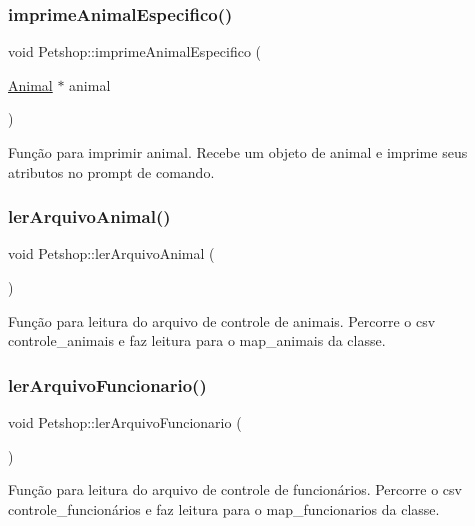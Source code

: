 \subsubsection{\texorpdfstring{imprime\+Animal\+Especifico()}{imprimeAnimalEspecifico()}}
{\footnotesize\ttfamily void Petshop\+::imprime\+Animal\+Especifico (\begin{DoxyParamCaption}\item[{\hyperlink{classAnimal}{Animal} $\ast$}]{animal }\end{DoxyParamCaption})}

Função para imprimir animal. Recebe um objeto de animal e imprime seus atributos no prompt de comando. \mbox{\label{classPetshop_a89862e7eff30a1241775ee836bc7a450}} 
\subsubsection{\texorpdfstring{ler\+Arquivo\+Animal()}{lerArquivoAnimal()}}
{\footnotesize\ttfamily void Petshop\+::ler\+Arquivo\+Animal (\begin{DoxyParamCaption}{ }\end{DoxyParamCaption})}

Função para leitura do arquivo de controle de animais. Percorre o csv controle\+\_\+animais e faz leitura para o map\+\_\+animais da classe. \mbox{\label{classPetshop_a1c810571e6044321fa00c7b2ccac37d5}} 
\subsubsection{\texorpdfstring{ler\+Arquivo\+Funcionario()}{lerArquivoFuncionario()}}
{\footnotesize\ttfamily void Petshop\+::ler\+Arquivo\+Funcionario (\begin{DoxyParamCaption}{ }\end{DoxyParamCaption})}

Função para leitura do arquivo de controle de funcionários. Percorre o csv controle\+\_\+funcionários e faz leitura para o map\+\_\+funcionarios da classe. \mbox{\label{classPetshop_a29770b7025d7b1f84e2dc946e730463e}} 
